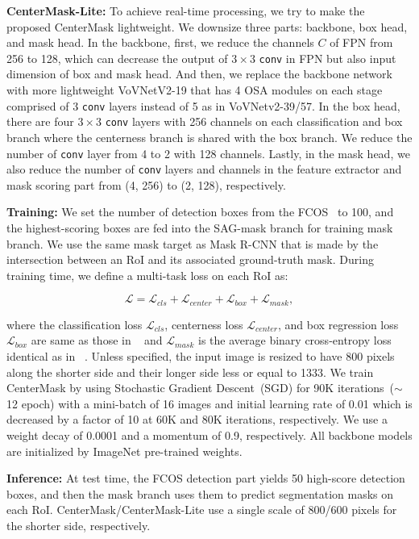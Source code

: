 \documentclass[10pt,twocolumn,letterpaper]{article}
\begin{document}
\noindent
\textbf{CenterMask-Lite:}
To achieve real-time processing, we try to make the proposed CenterMask lightweight.
We downsize three parts: backbone, box head, and mask head.
In the backbone, first, we reduce the channels $C$ of FPN from 256 to 128, which can decrease the output of $3\times3$ \texttt{conv} in FPN but also input dimension of box and mask head.
And then, we replace the backbone network with more lightweight VoVNetV2-19 that has 4 OSA modules on each stage comprised of 3 \texttt{conv} layers instead of 5 as in VoVNetv2-39/57.
In the box head, there are four $3\times3$ \texttt{conv} layers with 256 channels on each classification and box branch where the centerness branch is shared with the box branch.
We reduce the number of \texttt{conv} layer from 4 to 2 with 128 channels.
Lastly, in the mask head, we also reduce the number of \texttt{conv} layers and channels in the feature extractor and mask scoring part from (4, 256) to (2, 128), respectively.

\noindent
\textbf{Training:}
We set the number of detection boxes from the FCOS~\cite{Tian_2019_ICCV} to 100, and the highest-scoring boxes are fed into the SAG-mask branch for training mask branch.
We use the same mask target as Mask R-CNN that is made by the intersection between an RoI and its associated ground-truth mask.
During training time, we define a multi-task loss on each RoI as:

\begin{equation} \label{eq:8}
\mathcal{L} = \mathcal{L}_{cls} + \mathcal{L}_{center} + \mathcal{L}_{box} + \mathcal{L}_{mask},
\end{equation}

\noindent
where the classification loss $\mathcal{L}_{cls}$, centerness loss $\mathcal{L}_{center}$, and box regression loss $\mathcal{L}_{box}$ are same as those in ~\cite{Tian_2019_ICCV} and $\mathcal{L}_{mask}$ is the average binary cross-entropy loss identical as in ~\cite{he2017mask}.
Unless specified, the input image is resized to have 800 pixels~\cite{lin2017feature} along the shorter side and their longer side less or equal to 1333.
We train CenterMask by using Stochastic Gradient Descent~(SGD) for 90K iterations~($\sim$12 epoch) with a mini-batch of 16 images and initial learning rate of 0.01 which is decreased by a factor of 10 at 60K and 80K iterations, respectively.
We use a weight decay of 0.0001 and a momentum of 0.9, respectively.
All backbone models are initialized by ImageNet pre-trained weights. 


\noindent
\textbf{Inference:}
At test time, the FCOS detection part yields 50 high-score detection boxes, and then the mask branch uses them to predict segmentation masks on each RoI.
CenterMask/CenterMask-Lite use a single scale of 800/600 pixels for the shorter side, respectively.
\end{document}
